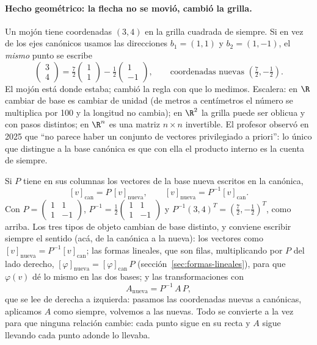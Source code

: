 \paragraph{Hecho geométrico: la flecha no se movió, cambió la grilla.} Un mojón tiene
coordenadas \((3,4)\) en la grilla cuadrada de siempre. Si en vez de los ejes canónicos usamos
las direcciones \(b_1=(1,1)\) y \(b_2=(1,-1)\), el \emph{mismo} punto se escribe
\[
  \begin{pmatrix}3\\4\end{pmatrix}
  =\tfrac72\begin{pmatrix}1\\1\end{pmatrix}-\tfrac12\begin{pmatrix}1\\-1\end{pmatrix},
  \qquad\text{coordenadas nuevas }(\tfrac72,-\tfrac12).
\]
El mojón está donde estaba; cambió la regla con que lo medimos. Escalera: en \(\R\) cambiar
de base es cambiar de unidad (de metros a centímetros el número se multiplica por 100 y la
longitud no cambia); en \(\R^2\) la grilla puede ser oblicua y con pasos distintos; en
\(\R^n\) es una matriz \(n\times n\) invertible. El profesor observó en 2025 que ``no parece
haber un conjunto de vectores privilegiado a priori'': lo único que distingue a la base
canónica es que con ella el producto interno es la cuenta de siempre.

\begin{resultado}
Si \(P\) tiene en sus columnas los vectores de la base nueva escritos en la canónica,
\[
  [v]_{\text{can}}=P\,[v]_{\text{nueva}},\qquad [v]_{\text{nueva}}=P^{-1}[v]_{\text{can}} .
\]
Con \(P=\begin{pmatrix}1&1\\1&-1\end{pmatrix}\), \(P^{-1}=\tfrac12\begin{pmatrix}1&1\\1&-1\end{pmatrix}\)
y \(P^{-1}(3,4)^T=(\tfrac72,-\tfrac12)^T\), como arriba. Los tres tipos de objeto cambian
de base distinto, y conviene escribir siempre el sentido (acá, de la canónica a la nueva):
los vectores como \([v]_{\text{nueva}}=P^{-1}[v]_{\text{can}}\); las formas lineales, que
son filas, multiplicando por \(P\) del lado derecho, \([\varphi]_{\text{nueva}}=[\varphi]_{\text{can}}\,P\)
(sección~\ref{sec:formas-lineales}), para que \(\varphi(v)\) dé lo mismo en las dos bases;
y las transformaciones con
\[
  A_{\text{nueva}}=P^{-1}\,A\,P ,
\]
que se lee de derecha a izquierda: pasamos las coordenadas nuevas a canónicas, aplicamos \(A\)
como siempre, volvemos a las nuevas. Todo se convierte a la vez para que ninguna relación
cambie: cada punto sigue en su recta y \(A\) sigue llevando cada punto adonde lo llevaba.
\end{resultado}

